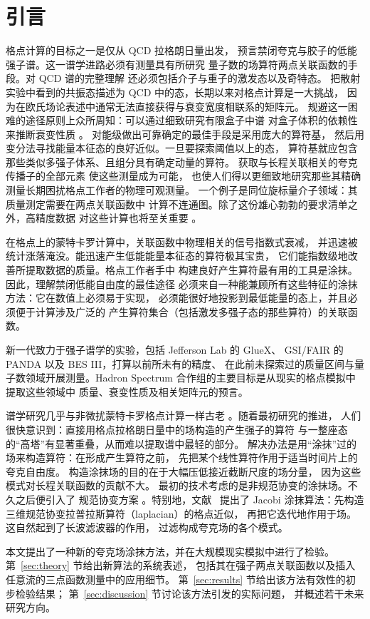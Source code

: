 \section{引言}

格点计算的目标之一是仅从 QCD 拉格朗日量出发，
预言禁闭夸克与胶子的低能强子谱。这一谱学进路必须有测量具有所研究
量子数的场算符两点关联函数的手段。对 QCD 谱的完整理解
还必须包括介子与重子的激发态以及奇特态。
把散射实验中看到的共振态描述为 QCD 中的态，长期以来对格点计算是一大挑战，
因为在欧氏场论表述中通常无法直接获得与衰变宽度相联系的矩阵元。
规避这一困难的途径原则上众所周知：可以通过细致研究有限盒子中谱
对盒子体积的依赖性来推断衰变性质 \cite{DeWitt:1956be,Luscher:1991cf}。
对能级做出可靠确定的最佳手段是采用庞大的算符基，
然后用变分法寻找能量本征态的良好近似。一旦要探索阈值以上的态，
算符基就应包含那些类似多强子体系、且组分具有确定动量的算符。
获取与长程关联相关的夸克传播子的全部元素 \cite{Foley:2005ac} 使这些测量成为可能，
也使人们得以更细致地研究那些其精确测量长期困扰格点工作者的物理可观测量。
一个例子是同位旋标量介子领域：其质量测定需要在两点关联函数中
计算不连通图。除了这份雄心勃勃的要求清单之外，高精度数据
对这些计算也将至关重要 \cite{Morningstar:2008mc}。

在格点上的蒙特卡罗计算中，关联函数中物理相关的信号指数式衰减，
并迅速被统计涨落淹没。能迅速产生低能能量本征态的算符极其宝贵，
它们能指数级地改善所提取数据的质量。格点工作者手中
构建良好产生算符最有用的工具是涂抹。因此，理解禁闭低能自由度的最佳途径
必须来自一种能兼顾所有这些特征的涂抹方法：它在数值上必须易于实现，
必须能很好地投影到最低能量的态上，并且必须便于计算涉及广泛的
产生算符集合（包括激发多强子态的那些算符）的关联函数。

新一代致力于强子谱学的实验，包括 Jefferson Lab 的 GlueX、
GSI/FAIR 的 PANDA 以及 BES III，打算以前所未有的精度、
在此前未探索过的质量区间与量子数领域开展测量。Hadron Spectrum
合作组的主要目标是从现实的格点模拟中提取这些领域中
质量、衰变性质及相关矩阵元的预言。

谱学研究几乎与非微扰蒙特卡罗格点计算一样古老
\cite{Hamber:1981zn,Weingarten:1980hx}。随着最初研究的推进，
人们很快意识到：直接用格点拉格朗日量中的场构造的产生强子的算符
与一整座态的``高塔''有显著重叠，从而难以提取谱中最轻的部分。
解决办法是用``涂抹''过的场来构造算符：在形成产生算符之前，
先把某个线性算符作用于适当时间片上的夸克自由度。
构造涂抹场的目的在于大幅压低接近截断尺度的场分量，
因为这些模式对长程关联函数的贡献不大。
最初的技术考虑的是非规范协变的涂抹场。不久之后便引入了
规范协变方案 \cite{Gusken:1989ad,
Allton:1993wc}。特别地，文献~\cite{Allton:1993wc} 提出了 Jacobi
涂抹算法：先构造三维规范协变拉普拉斯算符（laplacian）的格点近似，
再把它迭代地作用于场。这自然起到了长波滤波器的作用，
过滤构成夸克场的各个模式。


本文提出了一种新的夸克场涂抹方法，并在大规模现实模拟中进行了检验。
第~\ref{sec:theory} 节给出新算法的系统表述，
包括其在强子两点关联函数以及插入任意流的三点函数测量中的应用细节。
第~\ref{sec:results} 节给出该方法有效性的初步检验结果；
第~\ref{sec:discussion} 节讨论该方法引发的实际问题，
并概述若干未来研究方向。
